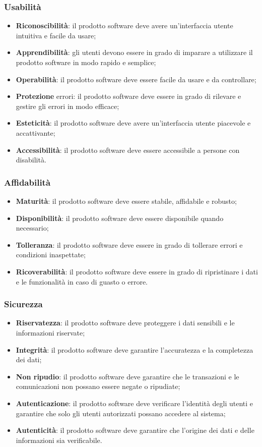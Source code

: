 \subsubsection{Usabilità}
\begin{itemize}
    \item \textbf{Riconoscibilità}: il prodotto software deve avere un'interfaccia utente intuitiva e facile da usare;
    \item \textbf{Apprendibilità}: gli utenti devono essere in grado di imparare a utilizzare il prodotto software in modo rapido e semplice;
    \item \textbf{Operabilità}: il prodotto software deve essere facile da usare e da controllare;
    \item \textbf{Protezione} errori: il prodotto software deve essere in grado di rilevare e gestire gli errori in modo efficace;
    \item \textbf{Esteticità}: il prodotto software deve avere un'interfaccia utente piacevole e accattivante;
    \item \textbf{Accessibilità}: il prodotto software deve essere accessibile a persone con disabilità.
\end{itemize}
\subsubsection{Affidabilità}
\begin{itemize}
    \item \textbf{Maturità}: il prodotto software deve essere stabile, affidabile e robusto;
    \item \textbf{Disponibilità}: il prodotto software deve essere disponibile quando necessario;
    \item \textbf{Tolleranza}: il prodotto software deve essere in grado di tollerare errori e condizioni inaspettate;
    \item \textbf{Ricoverabilità}: il prodotto software deve essere in grado di ripristinare i dati e le funzionalità in caso di guasto o errore.
\end{itemize}
\subsubsection{Sicurezza}
\begin{itemize}
    \item \textbf{Riservatezza}: il prodotto software deve proteggere i dati sensibili e le informazioni riservate;
    \item \textbf{Integrità}: il prodotto software deve garantire l'accuratezza e la completezza dei dati;
    \item \textbf{Non ripudio}: il prodotto software deve garantire che le transazioni e le comunicazioni non possano essere negate o ripudiate;
    \item \textbf{Autenticazione}: il prodotto software deve verificare l'identità degli utenti e garantire che solo gli utenti autorizzati possano accedere al sistema;
    \item \textbf{Autenticità}: il prodotto software deve garantire che l'origine dei dati e delle informazioni sia verificabile.
\end{itemize}
